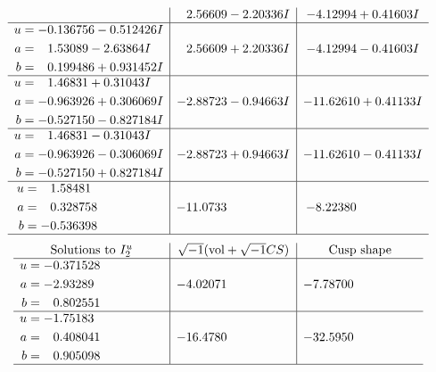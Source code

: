 \documentclass[1p]{elsarticle_modified}
\theoremstyle{definition}
\newcommand{\I}{\sqrt{-1}}
\begin{document}
$$\begin{array}{c|c|c}
 & \phantom{-}2.56609 - 2.20336 I & -4.12994 + 0.41603 I \\ \hline\begin{aligned}
u &= -0.136756 - 0.512426 I \\
a &= \phantom{-}1.53089 - 2.63864 I \\
b &= \phantom{-}0.199486 + 0.931452 I\end{aligned}
 & \phantom{-}2.56609 + 2.20336 I & -4.12994 - 0.41603 I \\ \hline\begin{aligned}
u &= \phantom{-}1.46831 + 0.31043 I \\
a &= -0.963926 + 0.306069 I \\
b &= -0.527150 - 0.827184 I\end{aligned}
 & -2.88723 - 0.94663 I & -11.62610 + 0.41133 I \\ \hline\begin{aligned}
u &= \phantom{-}1.46831 - 0.31043 I \\
a &= -0.963926 - 0.306069 I \\
b &= -0.527150 + 0.827184 I\end{aligned}
 & -2.88723 + 0.94663 I & -11.62610 - 0.41133 I \\ \hline\begin{aligned}
u &= \phantom{-}1.58481\phantom{ +0.000000I} \\
a &= \phantom{-}0.328758\phantom{ +0.000000I} \\
b &= -0.536398\phantom{ +0.000000I}\end{aligned}
 & -11.0733\phantom{ +0.000000I} & -8.22380\phantom{ +0.000000I}\\
 \hline 
 \end{array}$$\newpage$$\begin{array}{c|c|c}  
\text{Solutions to }I^u_{2}& \I (\text{vol} + \sqrt{-1}CS) & \text{Cusp shape}\\
 \hline 
\begin{aligned}
u &= -0.371528\phantom{ +0.000000I} \\
a &= -2.93289\phantom{ +0.000000I} \\
b &= \phantom{-}0.802551\phantom{ +0.000000I}\end{aligned}
 & -4.02071\phantom{ +0.000000I} & -7.78700\phantom{ +0.000000I} \\ \hline\begin{aligned}
u &= -1.75183\phantom{ +0.000000I} \\
a &= \phantom{-}0.408041\phantom{ +0.000000I} \\
b &= \phantom{-}0.905098\phantom{ +0.000000I}\end{aligned}
 & -16.4780\phantom{ +0.000000I} & -32.5950\phantom{ +0.000000I}\\
 \hline 
 \end{array}$$\newpage\newpage\renewcommand{\arraystretch}{1}
\end{document}
